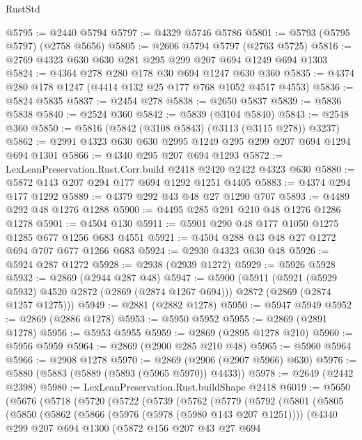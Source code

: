 \begin{lexlean}{RustStd}
\begin{coremodule}
@5795 := @2440 @5794
@5797 := @4329 @5746 @5786
@5801 := @5793 (@5795 @5797) (@2758 @5656)
@5805 := @2606 @5794 @5797 (@2763 @5725)
@5816 := @2769 @4323 @630 @630 @281 @295 @299 @207 @694 @1249 @694 @1303
@5824 := @4364 @278 @280 @178 @30 @694 @1247 @630 @360
@5835 := @4374 @280 @178 @1247 (@4414 @132 @25 @177 @768 @1052 @4517 @4553)
@5836 := @5824 @5835
@5837 := @2454 @278
@5838 := @2650 @5837
@5839 := @5836 @5838
@5840 := @2524 @360
@5842 := @5839 (@3104 @5840)
@5843 := @2548 @360
@5850 := @5816 (@5842 (@3108 @5843) (@3113 (@3115 @278)) @3237)
@5862 := @2991 @4323 @630 @630 @2995 @1249 @295 @299 @207 @694 @1294 @694 @1301
@5866 := @4340 @295 @207 @694 @1293
@5872 := LexLeanPreservation.Rust.Corr.build @2418 @2420 @2422 @4323 @630
@5880 := @5872 @143 @207 @294 @177 @694 @1292 @1251 @4405
@5883 := @4374 @294 @177 @1292
@5889 := @4379 @292 @43 @48 @27 @1290 @707
@5893 := @4489 @292 @48 @1276 @1288
@5900 := @4495 @285 @291 @210 @48 @1276 @1286 @1278
@5901 := @4504 @130
@5911 := @5901 @290 @48 @177 @1050 @1275 @1285 @677 @1256 @683 @4551
@5921 := @4504 @288 @43 @48 @27 @1272 @694 @707 @677 @1266 @683
@5924 := @2930 @4323 @630 @48
@5926 := @5924 @287 @1272
@5928 := @2938 (@2939 @1272)
@5929 := @5926 @5928
@5932 := @2869 (@2944 @287 @48)
@5947 := @5900
    (@5911
      (@5921 (@5929 @5932) @4520 @2872 (@2869 (@2874 @1267 @694)))
      @2872
      (@2869 (@2874 @1257 @1275)))
@5949 := @2881 (@2882 @1278)
@5950 := @5947 @5949
@5952 := @2869 (@2886 @1278)
@5953 := @5950 @5952
@5955 := @2869 (@2891 @1278)
@5956 := @5953 @5955
@5959 := @2869 (@2895 @1278 @210)
@5960 := @5956 @5959
@5964 := @2869 (@2900 @285 @210 @48)
@5965 := @5960 @5964
@5966 := @2908 @1278
@5970 := @2869 (@2906 (@2907 @5966) @630)
@5976 := @5880 (@5883 (@5889 (@5893 (@5965 @5970)) @4433))
@5978 := @2649 (@2442 @2398)
@5980 := LexLeanPreservation.Rust.buildShape @2418
@6019 := @5650
    (@5676
      (@5718
        (@5720
          (@5722
            (@5739
              (@5762
                (@5779
                  (@5792
                    (@5801
                      (@5805
                        (@5850
                          (@5862
                            (@5866 (@5976 (@5978 (@5980 @143 @207 @1251))))
                            (@4340
                              @299
                              @207
                              @694
                              @1300
                              (@5872
                                @156
                                @207
                                @43
                                @27
                                @694

\end{coremodule}
\end{lexlean}
